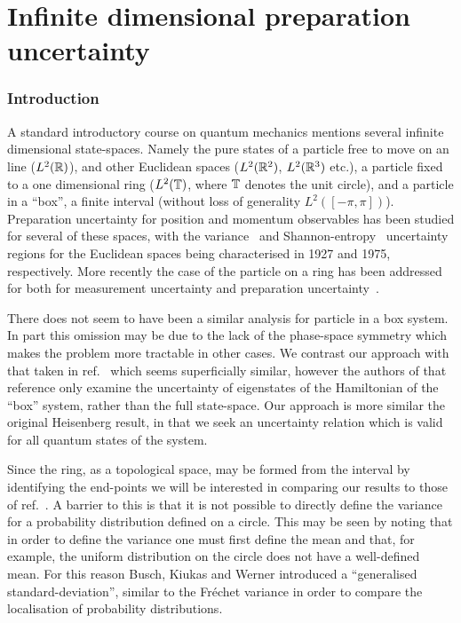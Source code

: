 \chapter{Infinite dimensional preparation uncertainty}\label{chap:infinite-prep-ur}
\subsection{Introduction}
A standard introductory course on quantum mechanics mentions several infinite dimensional state-spaces. Namely the pure states of a particle free to move on an line ($L^2(\mathbb{R})$), and other Euclidean spaces ($L^2(\mathbb{R}^2)$,  $L^2(\mathbb{R}^3)$ etc.), a particle fixed to a one dimensional ring ($L^2(\mathbb{T})$, where $\mathbb{T}$ denotes the unit circle), and a particle in a ``box'', a finite interval (without loss of generality $L^2([-\pi, \pi])$). Preparation uncertainty for position and momentum observables has been studied for several of these spaces, with the variance~\cite{Heisenberg1927-Wheeler+Zurek} and Shannon-entropy~\cites{Bialynicki-BirulaMycielski1975}{beckner-1975} uncertainty regions for the Euclidean spaces being characterised in 1927 and 1975, respectively. More recently the case of the particle on a ring has been addressed for both for measurement uncertainty and preparation uncertainty~\cite{sharp-ur-num-angle}. 

There does not seem to have been a similar analysis for particle in a box system. In part this omission may be due to the lack of the phase-space symmetry which makes the problem more tractable in other cases. We contrast our approach with that taken in ref.~\cite{entropic-ur-infinite-well} which seems superficially similar, however the authors of that reference only examine the uncertainty of eigenstates of the Hamiltonian of the ``box'' system, rather than the full state-space. Our approach is more similar the original Heisenberg result, in that we seek an uncertainty relation which is valid for all quantum states of the system.

Since the ring, as a topological space, may be formed from the interval by identifying the end-points we will be interested in comparing our results to those of ref.~\cite{sharp-ur-num-angle}. A barrier to this is that it is not possible to directly define the variance for a probability distribution defined on a circle. This may be seen by noting that in order to define the variance one must first define the mean and that, for example, the uniform distribution on the circle does not have a well-defined mean. For this reason Busch, Kiukas and Werner introduced a ``generalised standard-deviation'', similar to the Fr{\'e}chet variance in order to compare the localisation of probability distributions.  

